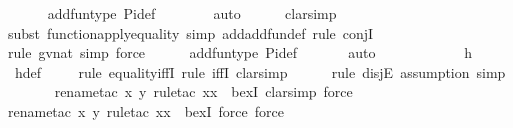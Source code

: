 \begin{isabellebody}
\ \ \ \ \isamarkupfalse%
\ add{\isacharunderscore}{\kern0pt}fun{\isacharunderscore}{\kern0pt}type\ Pi{\isacharunderscore}{\kern0pt}def\isanewline
\ \ \ \ \ \ \isamarkupfalse%
\ auto{\isacharbrackleft}{\kern0pt}{}{\isacharbrackright}{\kern0pt}\isanewline
\ \ \ \ \isamarkupfalse%
\ clarsimp\isanewline
\ \ \ \ \isamarkupfalse%
{\isacharparenleft}{\kern0pt}subst\ function{\isacharunderscore}{\kern0pt}apply{\isacharunderscore}{\kern0pt}equality{\isacharcomma}{\kern0pt}\ simp\ add{\isacharcolon}{\kern0pt}add{\isacharunderscore}{\kern0pt}fun{\isacharunderscore}{\kern0pt}def{\isacharcomma}{\kern0pt}\ rule\ conjI{\isacharparenright}{\kern0pt}\isanewline
\ \ \ \ \ \ \ \isamarkupfalse%
{\isacharparenleft}{\kern0pt}rule\ gvnat{\isacharcomma}{\kern0pt}\ simp{\isacharcomma}{\kern0pt}\ force{\isacharparenright}{\kern0pt}\isanewline
\ \ \ \ \isamarkupfalse%
\ add{\isacharunderscore}{\kern0pt}fun{\isacharunderscore}{\kern0pt}type\ Pi{\isacharunderscore}{\kern0pt}def\isanewline
\ \ \ \ \ \isamarkupfalse%
\ auto{\isacharbrackleft}{\kern0pt}{}{\isacharbrackright}{\kern0pt}\isanewline
\ \ \ \ \isamarkupfalse%
\isanewline
\ \ \isamarkupfalse%
\ \isamarkupfalse%
\ {\isachardoublequoteopen}{\isachardot}{\kern0pt}{\isachardot}{\kern0pt}{\isachardot}{\kern0pt}\ {\isacharequal}{\kern0pt}\ h{\isachardoublequoteclose}\ \isanewline
\ \ \ \ \isamarkupfalse%
\ h{\isacharunderscore}{\kern0pt}def\isanewline
\ \ \ \ \isamarkupfalse%
{\isacharparenleft}{\kern0pt}rule\ equality{\isacharunderscore}{\kern0pt}iffI{\isacharcomma}{\kern0pt}\ rule\ iffI{\isacharcomma}{\kern0pt}\ clarsimp{\isacharparenright}{\kern0pt}\isanewline
\ \ \ \ \ \isamarkupfalse%
{\isacharparenleft}{\kern0pt}rule\ disjE{\isacharcomma}{\kern0pt}\ assumption{\isacharcomma}{\kern0pt}\ simp{\isacharparenright}{\kern0pt}\isanewline
\ \ \ \ \ \ \isamarkupfalse%
{\isacharparenleft}{\kern0pt}rename{\isacharunderscore}{\kern0pt}tac\ x\ y{\isacharcomma}{\kern0pt}\ rule{\isacharunderscore}{\kern0pt}tac\ x{\isacharequal}{\kern0pt}x\ \ bexI{\isacharcomma}{\kern0pt}\ clarsimp{\isacharcomma}{\kern0pt}\ force{\isacharparenright}{\kern0pt}\isanewline
\ \ \ \ \ \isamarkupfalse%
{\isacharparenleft}{\kern0pt}rename{\isacharunderscore}{\kern0pt}tac\ x\ y{\isacharcomma}{\kern0pt}\ rule{\isacharunderscore}{\kern0pt}tac\ x{\isacharequal}{\kern0pt}x\ \ bexI{\isacharcomma}{\kern0pt}\ force{\isacharcomma}{\kern0pt}\ force{\isacharparenright}{\kern0pt}\isanewline

\end{isabellebody}
